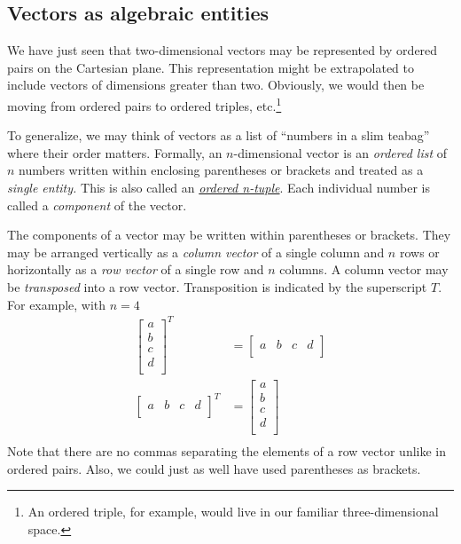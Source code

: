 \documentclass[
  a4paper,
]{article}
\begin{document}
\hypertarget{vectors-as-algebraic-entities}{%
\subsection{Vectors as algebraic
entities}\label{vectors-as-algebraic-entities}}

We have just seen that two-dimensional vectors may be represented by
ordered pairs on the Cartesian plane. This representation might be
extrapolated to include vectors of dimensions greater than two.
Obviously, we would then be moving from ordered pairs to ordered
triples, etc.\footnote{An ordered triple, for example, would live in our
  familiar three-dimensional space.}

To generalize, we may think of vectors as a list of ``numbers in a slim
teabag'' where their order matters. Formally, an \(n\)-dimensional
vector is an \emph{ordered list} of \(n\) numbers written within
enclosing parentheses or brackets and treated as a \emph{single entity.}
This is also called an
\href{https://en.wikipedia.org/wiki/Tuple}{\emph{ordered n-tuple}}. Each
individual number is called a \emph{component} of the vector.

The components of a vector may be written within parentheses or
brackets. They may be arranged vertically as a \emph{column vector} of a
single column and \(n\) rows or horizontally as a \emph{row vector} of a
single row and \(n\) columns. A column vector may be \emph{transposed}
into a row vector. Transposition is indicated by the superscript \(T\).
For example, with \(n = 4\) \[
\begin{aligned}
\begin{bmatrix}a\\b\\c\\d\\\end{bmatrix}^{T} & = \begin{bmatrix}a&b&c&d\\\end{bmatrix}\\
\begin{bmatrix}a&b&c&d\\\end{bmatrix}^{T} & = \begin{bmatrix}a\\b\\c\\d\\\end{bmatrix}\\
\end{aligned}
\] Note that there are no commas separating the elements of a row vector
unlike in ordered pairs. Also, we could just as well have used
parentheses as brackets.
\end{document}
